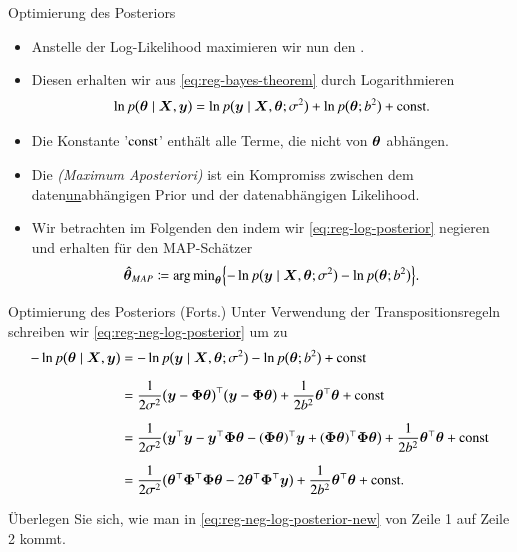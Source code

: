 \begin{frame}{Optimierung des Posteriors}{}
	\begin{itemize}
		\item Anstelle der Log-Likelihood maximieren wir nun den .
		\item Diesen erhalten wir aus \eqref{eq:reg-bayes-theorem} durch Logarithmieren
		\begin{equation} \label{eq:reg-log-posterior}
			\ln p\bigl( \bm{\theta} \mid \bm{X}, \bm{y} \bigr)
				= \ln p\bigl( \bm{y} \mid \bm{X}, \bm{\theta}; \sigma^2 \bigr) + \ln p\bigl( \bm{\theta}; b^2 \bigr) + \text{const}.
		\end{equation}
		\item Die Konstante '$\text{const}$' enthält alle Terme, die nicht von $\bm{\theta}$ abhängen.
		\item Die  \textit{(Maximum Aposteriori)} ist ein Kompromiss zwischen dem daten\underline{un}abhängigen Prior
			und der datenabhängigen Likelihood.
		\item Wir betrachten im Folgenden den  indem wir \eqref{eq:reg-log-posterior} negieren und erhalten
			für den MAP-Schätzer
		\begin{equation} \label{eq:reg-neg-log-posterior}
			\bm{\hat{\theta}}_{MAP} \coloneqq \operatorname{arg\,min}_{\bm{\theta}}\Bigl\{ -\ln p\bigl( \bm{y} \mid \bm{X}, \bm{\theta}; \sigma^2 \bigr)
				- \ln p\bigl( \bm{\theta}; b^2 \bigr) \Bigr\}.
		\end{equation}
	\end{itemize}
\end{frame}


\begin{frame}{Optimierung des Posteriors (Forts.)}{}
	Unter Verwendung der Transpositionsregeln schreiben wir \eqref{eq:reg-neg-log-posterior} um zu
	\begin{equation} \label{eq:reg-neg-log-posterior-new}
		\begin{aligned}
			-\ln p\bigl( \bm{\theta} \mid \bm{X}, \bm{y} \bigr)
				&= -\ln p\bigl( \bm{y} \mid \bm{X}, \bm{\theta}; \sigma^2 \bigr) - \ln p\bigl( \bm{\theta}; b^2 \bigr) + \text{const}
		\\[2mm]
				&= \frac{1}{2 \sigma^2} \bigl( \bm{y} - \bm{\Phi} \bm{\theta} \bigr)^\top \bigl( \bm{y} - \bm{\Phi} \bm{\theta} \bigr)
					+ \frac{1}{2 b^2} \bm{\theta}^\top \bm{\theta} + \text{const}
		\\[2mm]
				&= \frac{1}{2 \sigma^2} \bigl( \bm{y}^\top \bm{y} - \bm{y}^\top \bm{\Phi} \bm{\theta} - (\bm{\Phi} \bm{\theta})^\top \bm{y}
					+ (\bm{\Phi} \bm{\theta})^\top \bm{\Phi} \bm{\theta} \bigr) + \frac{1}{2 b^2} \bm{\theta}^\top \bm{\theta} + \text{const}
		\\[2mm]
				&= \frac{1}{2 \sigma^2} \bigl( \bm{\theta}^\top \bm{\Phi}^\top \bm{\Phi} \bm{\theta} - 2 \bm{\theta}^\top \bm{\Phi}^\top \bm{y} \bigr)
					+ \frac{1}{2 b^2} \bm{\theta}^\top \bm{\theta} + \text{const}.
		\end{aligned}
	\end{equation}
	
	\begin{mytask}
		Überlegen Sie sich, wie man in \eqref{eq:reg-neg-log-posterior-new} von Zeile 1 auf Zeile 2 kommt.
	\end{mytask}
\end{frame}



